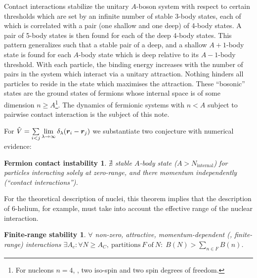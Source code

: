 \documentclass[aps,prd,onecolumn
,tightenlines,letterpaper,
notitlepage,11pt,
nofootinbib]{revtex4-1}
\begin{document}
Contact interactions stabilize the unitary $A$-boson system
with respect to certain thresholds which are set by an infinite
number of stable 3-body states, each of which is correlated with a
pair (one shallow and one deep) of 4-body states.
A pair of 5-body states is then found for each of the deep 4-body states.
This pattern generalizes such that a stable pair of a deep, and a shallow $A+1$-body state
is found for each $A$-body state which is deep relative to its $A-1$-body threshold.
With each particle, the binding energy increases with the number of pairs
in the system which interact via a unitary attraction. Nothing hinders all particles
to reside in the state which maximises the attraction.
These ``bosonic'' states are the ground states of fermions whose internal space
is of some dimension $n\geq A$\footnote{For nucleons $n=4$, \ie, two iso-spin and two spin degrees of freedom.}. The dynamics of fermionic systems with $n<A$ subject
to pairwise contact interaction is the subject of this note.

For
$\hat{V}=\sum\limits_{i<j}\lim\limits_{\lambda\to\infty}\delta_\lambda(\boldsymbol{r}_i-\boldsymbol{r}_j)$
we substantiate two conjecture with numerical evidence:

\newtheorem*{thm1}{Fermion contact instability}
\begin{thm1}
$\nexists$ stable $A$-body state ($A>N_\text{internal}$) for particles interacting
solely at zero-range, and there momentum independently (``contact interactions'').
\end{thm1}

For the theoretical description of nuclei, this theorem implies that the description of
6-helium, for example, must take into account the effective range of the nuclear interaction.

\newtheorem*{thm2}{Finite-range stability}
\begin{thm2}
$\forall$ non-zero, attractive, momentum-dependent (\ie, finite-range) interactions
$\exists A_c:\forall N\geq A_C,~\text{partitions}~F~\text{of}~N:\;B(N)>\sum\limits_{n\in F}B(n)$.
\end{thm2}
\end{document}
